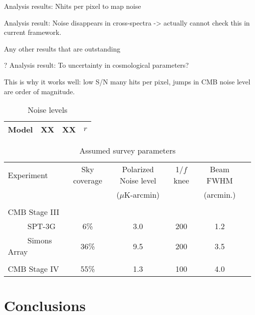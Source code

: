 \documentclass[apj]{emulateapj}
\begin{document}
Analysis results: Nhits per pixel to map noise

Analysis result: Noise disappears in cross-spectra -> actually cannot check this in current framework.

Any other results that are outstanding

? Analysis result: To uncertainty in cosmological parameters?

This is why it works well: low S/N many hits per pixel, jumps in CMB noise level are order of magnitude.


\begin{table}[tbh]
\begin{center}
\caption{\label{tab:noise} Noise levels}
\small
\begin{tabular}{l | c c c }
Model   & XX&XX&$r$\\
\hline

\end{tabular}
 \normalsize
\end{center}
\end{table}

\begin{table*}[tbh]
\begin{center}
\caption{\label{tab:experiments} Assumed survey parameters}
\small
\begin{tabular}{l || c c c c c }
Experiment & Sky coverage & Polarized Noise level  & 1/$f$ knee & Beam FWHM \\
& &($\mu$K-arcmin)&&(arcmin.)\\
\hline
\tiny \\ \small
CMB Stage III & & & & \\
~~~~~SPT-3G & 6\% & 3.0 & 200 & 1.2 \\
~~~~~Simons Array & 36\% & 9.5 & 200 & 3.5 \\ 
\tiny \\ \small
CMB Stage IV & 55\% & 1.3 & 100 & 4.0 \\
\end{tabular}
 \normalsize
\end{center}
\end{table*}

\section{Conclusions}
\label{sec:conclusions}
\end{document}
